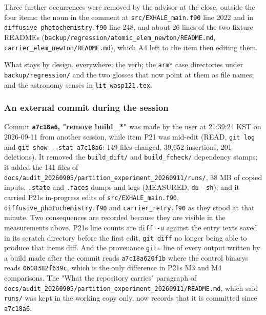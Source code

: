 \documentclass[english,a4paper]{my_memo}
\begin{document}
Three further occurrences were removed by the advisor at the close, outside the
four items: the noun in the comment at \texttt{src/EXHALE\_main.f90} line 2022 and in
\texttt{diffusive\_photochemistry.f90} line 248, and about 26 lines of the two fixture
READMEs (\texttt{backup/regression/atomic\_elem\_newton/README.md},
\texttt{carrier\_elem\_newton/README.md}), which A4 left to the item then editing them.

What stays by design, everywhere: the verb; the \texttt{arm*} case directories under
\texttt{backup/regression/} and the two glosses that now point at them as file names;
and the astronomy senses in \texttt{lit\_wasp121.tex}.

\subsubsection{An external commit during the session}\label{an-external-commit-during-the-session}

Commit \textbf{\texttt{a7c18a6}, "remove build\_*"} was made by the user at 21:39:24 KST on
2026-09-11 from another session, while item P21 was mid-edit (READ, \texttt{git\ log}
and \texttt{git\ show\ -\/-stat\ a7c18a6}: 149 files changed, 39,652 insertions, 201
deletions). It removed the \texttt{build\_dift/} and \texttt{build\_fcheck/} dependency stamps;
it added the 141 files of
\texttt{docs/audit\_20260905/partition\_experiment\_20260911/runs/}, 38 MB of copied
inputs, \texttt{.state} and \texttt{.faces} dumps and logs (MEASURED, \texttt{du\ -sh}); and it
carried P21\textquotesingle s in-progress edits of \texttt{src/EXHALE\_main.f90},
\texttt{diffusive\_photochemistry.f90} and \texttt{carrier\_retry.f90} as they stood at that
minute. Two consequences are recorded because they are visible in the
measurements above. P21\textquotesingle s line counts are \texttt{diff\ -u} against the entry texts
saved in its scratch directory before the first edit, \texttt{git\ diff} no longer being
able to produce that item\textquotesingle s diff. And the provenance \texttt{git=} line of every output
written by a build made after the commit reads \texttt{a7c18a620f1b} where the control
binary\textquotesingle s reads \texttt{0608382f639c}, which is the only difference in P21\textquotesingle s M3 and M4
comparisons. The "What the repository carries" paragraph of
\texttt{docs/audit\_20260905/partition\_experiment\_20260911/README.md}, which said
\texttt{runs/} was kept in the working copy only, now records that it is committed
since \texttt{a7c18a6}.
\end{document}
